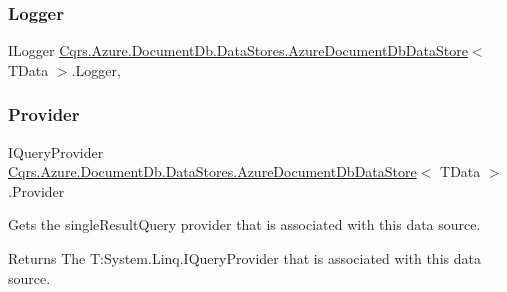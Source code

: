 \subsubsection{\texorpdfstring{Logger}{Logger}}
{\footnotesize\ttfamily I\+Logger \hyperlink{classCqrs_1_1Azure_1_1DocumentDb_1_1DataStores_1_1AzureDocumentDbDataStore}{Cqrs.\+Azure.\+Document\+Db.\+Data\+Stores.\+Azure\+Document\+Db\+Data\+Store}$<$ T\+Data $>$.Logger\hspace{0.3cm}{\ttfamily [get]}, {\ttfamily [protected]}}

\mbox{\label{classCqrs_1_1Azure_1_1DocumentDb_1_1DataStores_1_1AzureDocumentDbDataStore_ac7beb3868691d1cba378fa58e3f0e999}} 
\subsubsection{\texorpdfstring{Provider}{Provider}}
{\footnotesize\ttfamily I\+Query\+Provider \hyperlink{classCqrs_1_1Azure_1_1DocumentDb_1_1DataStores_1_1AzureDocumentDbDataStore}{Cqrs.\+Azure.\+Document\+Db.\+Data\+Stores.\+Azure\+Document\+Db\+Data\+Store}$<$ T\+Data $>$.Provider\hspace{0.3cm}{\ttfamily [get]}}



Gets the single\+Result\+Query provider that is associated with this data source. 

\begin{DoxyReturn}{Returns}
The T\+:\+System.\+Linq.\+I\+Query\+Provider that is associated with this data source. 
\end{DoxyReturn}
